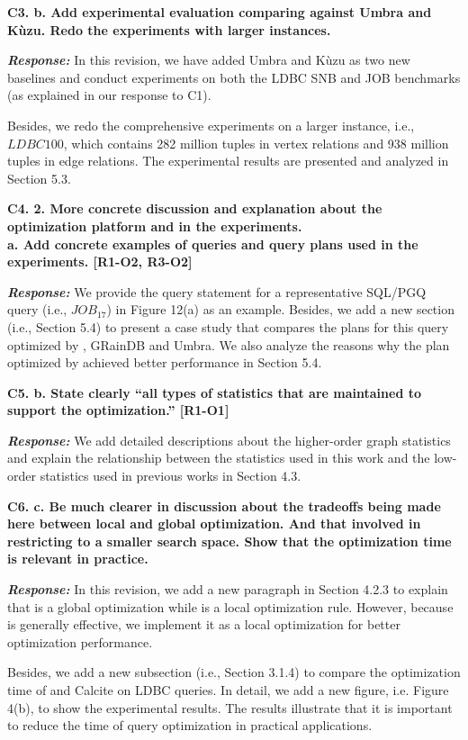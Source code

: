 \textbf{C3. b. Add experimental evaluation comparing against Umbra and Kùzu. Redo the experiments with larger instances.}

\textbf{\textit{Response: }}
In this revision, we have added Umbra and K\`uzu as two new baselines and conduct experiments on both the LDBC SNB and JOB benchmarks (as explained in our response to C1).


Besides, we redo the comprehensive experiments on a larger instance, i.e., $LDBC100$, which contains 282 million tuples in vertex relations and 938 million tuples in edge relations.
The experimental results are presented and analyzed in Section 5.3.


\textbf{
C4. 2. More concrete discussion and explanation about the optimization platform and in the experiments. \\
a. Add concrete examples of queries and query plans used in the experiments. [R1-O2, R3-O2]
}

\textbf{\textit{Response: }}
We provide the query statement for a representative SQL/PGQ query (i.e., $JOB_{17}$) in Figure 12(a) as an example.
Besides, we add a new section (i.e., Section 5.4) to present a case study that compares the plans for this query optimized by \name, GRainDB and Umbra.
We also analyze the reasons why the plan optimized by \name achieved better performance in Section 5.4.


\textbf{
C5. b. State clearly “all types of statistics that are maintained to support the optimization.” [R1-O1]}

\textbf{\textit{Response: }}
We add detailed descriptions about the higher-order graph statistics and explain the relationship between the statistics used in this work and the low-order statistics used in previous works in Section 4.3.


\textbf{
C6. c. Be much clearer in discussion about the tradeoffs being made here between local and global optimization. And that involved in restricting to a smaller search space. Show that the optimization time is relevant in practice.}

\textbf{\textit{Response: }} 
In this revision, we add a new paragraph in Section 4.2.3 to explain that \filterrule is a global optimization while \fusionrule is a local optimization rule.
However, because \filterrule is generally effective, we implement it as a local optimization for better optimization performance.

Besides, we add a new subsection (i.e., Section 3.1.4) to compare the optimization time of \name and Calcite on LDBC queries.
In detail, we add a new figure, i.e. Figure 4(b), to show the experimental results.
The results illustrate that it is important to reduce the time of query optimization in practical applications. 


